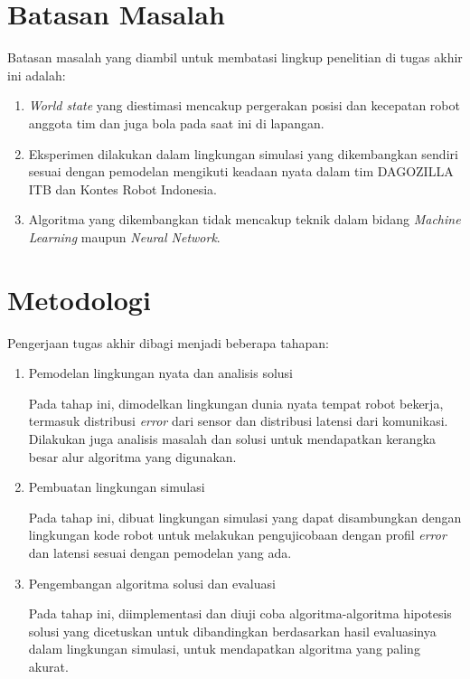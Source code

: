 \section{Batasan Masalah}

Batasan masalah yang diambil untuk membatasi lingkup penelitian di tugas akhir ini adalah:

\begin{enumerate}
    \item \textit{World state} yang diestimasi mencakup pergerakan posisi dan kecepatan robot anggota tim dan juga bola pada saat ini di lapangan.
    \item Eksperimen dilakukan dalam lingkungan simulasi yang dikembangkan sendiri sesuai dengan pemodelan mengikuti keadaan nyata dalam tim DAGOZILLA ITB dan Kontes Robot Indonesia.
    \item Algoritma yang dikembangkan tidak mencakup teknik dalam bidang \textit{Machine Learning} maupun \textit{Neural Network}.
\end{enumerate}

\section{Metodologi}

Pengerjaan tugas akhir dibagi menjadi beberapa tahapan:

\begin{enumerate}
    \item Pemodelan lingkungan nyata dan analisis solusi

          Pada tahap ini, dimodelkan lingkungan dunia nyata tempat robot bekerja, termasuk distribusi \textit{error} dari sensor dan distribusi latensi dari komunikasi. Dilakukan juga analisis masalah dan solusi untuk mendapatkan kerangka besar alur algoritma yang digunakan.

    \item Pembuatan lingkungan simulasi

          Pada tahap ini, dibuat lingkungan simulasi yang dapat disambungkan dengan lingkungan kode robot untuk melakukan pengujicobaan dengan profil \textit{error} dan latensi sesuai dengan pemodelan yang ada.

    \item Pengembangan algoritma solusi dan evaluasi

          Pada tahap ini, diimplementasi dan diuji coba algoritma-algoritma hipotesis solusi yang dicetuskan untuk dibandingkan berdasarkan hasil evaluasinya dalam lingkungan simulasi, untuk mendapatkan algoritma yang paling akurat.
\end{enumerate}

